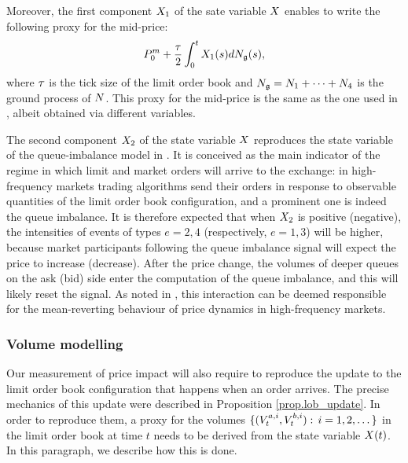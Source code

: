 \documentclass[10pt, article,table]{article}
\begin{document}
Moreover, the first component $\stateVariable_1$ of the sate variable $\stateVariable$ enables to write the following proxy for the mid-price:
\begin{equation}\label{eq.midprice_proxy}
 \midprice_0 + \frac{\tickSizeOfLOB}{2} \intzerot \stateVariable_1(s) d\groundProc(s),
\end{equation}
where $\tickSizeOfLOB$ is the tick size of the limit order book and $\groundProc = \countingProc[1] + \dots + \countingProc[4]$ is the ground process of $\multiCountingProc$. This proxy for the mid-price  is the same as the one used in \citealp{BM14haw}, albeit obtained via different variables. 

The second component $\stateVariable_2$ of the state variable $\stateVariable$ reproduces the state variable of the queue-imbalance model in \citealp{MP18sta}. It is conceived as the main indicator of the regime in which limit and market orders will arrive to the exchange: in high-frequency markets trading algorithms send their orders in response to observable quantities of the limit order book configuration, and a prominent one is indeed the queue imbalance. It is therefore expected that when $\stateVariable_2$ is positive (negative), the intensities of events of types $e=2,4$ (respectively, $e=1,3$) will be higher, because market participants following the queue imbalance signal will expect the price to increase (decrease). After the price change,  the volumes of deeper queues on the ask (bid) side enter the computation of the queue imbalance, and this will likely reset the signal.  As noted in \citealp{MP18sta}, this interaction can be deemed responsible for the mean-reverting behaviour of price dynamics in high-frequency markets. 


\subsubsection{Volume modelling}
Our measurement of price impact will also require to reproduce the update to the limit order book configuration that happens when an order arrives. The precise mechanics of this update were described in Proposition \ref{prop.lob_update}. In order to reproduce them, a proxy for the volumes $\lbrace (\nthBestAskVolume[i]_t, \nthBestBidVolume[i]_t): \, i=1,2,\dots\rbrace$ in the limit order book at time $t$ needs to be derived from the state variable $\stateVariable(t)$. In this paragraph, we describe how this is done. 
\end{document}
